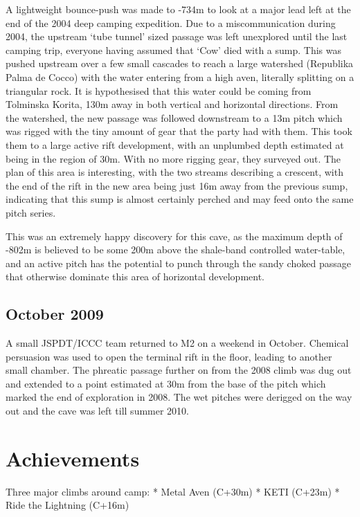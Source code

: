 A lightweight bounce-push was made to -734m to look at a major lead left
at the end of the 2004 deep camping expedition. Due to a
miscommunication during 2004, the upstream `tube tunnel' sized passage
was left unexplored until the last camping trip, everyone having assumed
that `Cow' died with a sump. This was pushed upstream over a few small
cascades to reach a large watershed (Republika Palma de Cocco) with the
water entering from a high aven, literally splitting on a triangular
rock. It is hypothesised that this water could be coming from Tolminska
Korita, 130m away in both vertical and horizontal directions. From the
watershed, the new passage was followed downstream to a 13m pitch which
was rigged with the tiny amount of gear that the party had with them.
This took them to a large active rift development, with an unplumbed
depth estimated at being in the region of 30m. With no more rigging
gear, they surveyed out. The plan of this area is interesting, with the
two streams describing a crescent, with the end of the rift in the new
area being just 16m away from the previous sump, indicating that this
sump is almost certainly perched and may feed onto the same pitch
series.

This was an extremely happy discovery for this cave, as the maximum
depth of -802m is believed to be some 200m above the shale-band
controlled water-table, and an active pitch has the potential to punch
through the sandy choked passage that otherwise dominate this area of
horizontal development.

\subsection{October 2009}\label{october-2009}

A small JSPDT/ICCC team returned to M2 on a weekend in October. Chemical
persuasion was used to open the terminal rift in the floor, leading to
another small chamber. The phreatic passage further on from the 2008
climb was dug out and extended to a point estimated at 30m from the base
of the pitch which marked the end of exploration in 2008. The wet
pitches were derigged on the way out and the cave was left till summer
2010.

\section{Achievements}\label{achievements}

Three major climbs around camp: * Metal Aven (C+30m) * KETI (C+23m) *
Ride the Lightning (C+16m)

